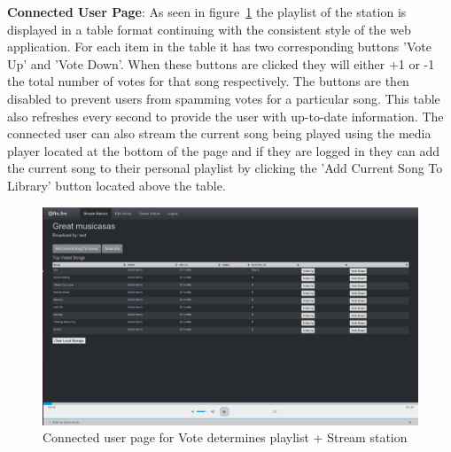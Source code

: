 \documentclass[a4paper, 12pt]{report}
\begin{document}
\textbf{Connected User Page}: As seen in figure~\ref{station-type-1-listener} the playlist of the station is displayed in a table format continuing with the consistent style of the web application. For each item in the table it has two corresponding buttons 'Vote Up' and 'Vote Down'. When these buttons are clicked they will either +1 or -1 the total number of votes for that song respectively. The buttons are then disabled to prevent users from spamming votes for a particular song. This table also refreshes every second to provide the user with up-to-date information.
The connected user can also stream the current song being played using the media player located at the bottom of the page and if they are logged in they can add the current song to their personal playlist by clicking the 'Add Current Song To Library' button located above the table.
\begin{figure}[H]
  \centering
    \includegraphics[width=1.0\textwidth]{screenshots/station-type-1-listener.png}
    \caption{Connected user page for Vote determines playlist + Stream station}
    \label{station-type-1-listener}
\end{figure}
\end{document}
